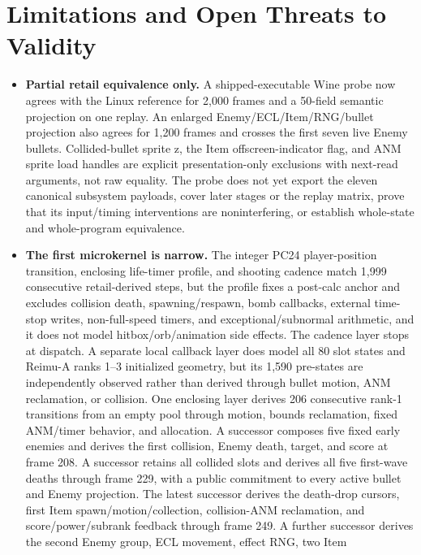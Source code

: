\section{Limitations and Open Threats to Validity}

\begin{itemize}
  \item \textbf{Partial retail equivalence only.}  A shipped-executable Wine
  probe now agrees with the Linux reference for 2,000 frames and a 50-field
  semantic projection on one replay.  An enlarged Enemy/ECL/Item/RNG/bullet
  projection also agrees for 1,200 frames and crosses the first seven live
  Enemy bullets.  Collided-bullet sprite z, the Item offscreen-indicator flag,
  and ANM sprite load handles are explicit presentation-only exclusions with
  next-read arguments, not raw equality.  The probe does not yet export the eleven canonical
  subsystem payloads, cover later stages or the replay matrix, prove that its
  input/timing interventions are noninterfering, or establish whole-state and
  whole-program equivalence.
  \item \textbf{The first microkernel is narrow.}  The integer PC24
  player-position transition, enclosing life-timer profile, and shooting
  cadence match 1,999
  consecutive retail-derived steps, but the profile fixes a post-calc anchor
  and excludes collision death, spawning/respawn, bomb callbacks, external
  time-stop writes, non-full-speed timers, and exceptional/subnormal arithmetic,
  and it does not model hitbox/orb/animation side effects.  The cadence layer
  stops at  dispatch.  A separate local callback layer does
  model all 80 slot states and Reimu-A ranks 1--3 initialized geometry, but its
  1,590 pre-states are independently observed rather than derived through
  bullet motion, ANM reclamation, or collision.  One enclosing layer derives
  206 consecutive rank-1 transitions from an empty pool through motion, bounds
  reclamation, fixed ANM/timer behavior, and allocation.  A successor composes
  five fixed early enemies and derives the first collision, Enemy death, target,
  and score at frame 208.  A successor retains all collided slots and derives
  all five first-wave deaths through frame 229, with a public commitment to
  every active bullet and Enemy projection.  The latest successor derives the
  death-drop cursors, first Item spawn/motion/collection, collision-ANM
  reclamation, and score/power/subrank feedback through frame 249.  A further
  successor derives the second Enemy group, ECL movement, effect RNG, two Item

\end{itemize}
